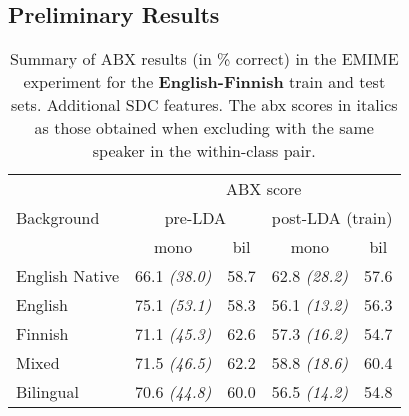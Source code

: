 \subsection{Preliminary Results}


\begin{table}[h!]
\centering
\begin{tabular}{@{}lclcl@{}}
\toprule
\multirow{3}{*}{Background} & \multicolumn{4}{c}{ABX score} \\
 & \multicolumn{2}{c}{pre-LDA} & \multicolumn{2}{c}{post-LDA (train)} \\
 & mono & \multicolumn{1}{c}{bil} & mono & \multicolumn{1}{c}{bil} \\ \midrule
 English Native & 66.1 \textit{(38.0)} & 58.7  & 62.8 \textit{(28.2)} & 57.6  \\
English & 75.1 \textit{(53.1)} & 58.3  & 56.1 \textit{(13.2)} & 56.3  \\
Finnish & 71.1 \textit{(45.3)} & 62.6  & 57.3 \textit{(16.2)} & 54.7 \\
Mixed & \multicolumn{1}{l}{71.5 \textit{(46.5)}} & 62.2 & \multicolumn{1}{l}{58.8 \textit{(18.6)}} & 60.4  \\
Bilingual & \multicolumn{1}{l}{70.6 \textit{(44.8)}} & 60.0  & \multicolumn{1}{l}{56.5 \textit{(14.2)}} & 54.8 \\ \bottomrule
\end{tabular}
\caption{Summary of ABX results (in \% correct) in the EMIME experiment for the \textbf{English-Finnish} train and test sets.  Additional SDC features. The abx scores in italics as those obtained when excluding with the same speaker in the within-class pair. }
\label{Table: xxx}
\end{table}


